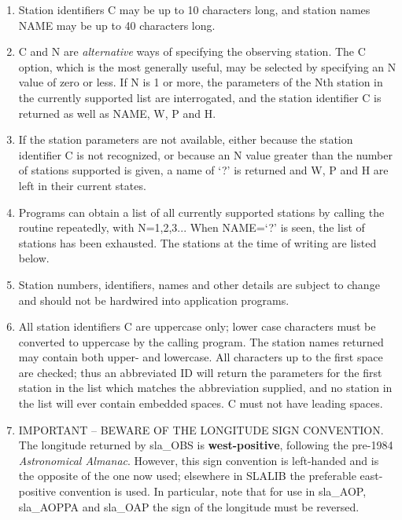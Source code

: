 \documentclass[11pt,twoside]{article}
\begin{document}
{
 \begin{enumerate}
  \item Station identifiers C may be up to 10 characters long,
        and station names NAME may be up to 40 characters long.
  \item C and N are {\it alternative}\/ ways of specifying the observing
        station.  The C option, which is the most generally useful,
        may be selected by specifying an N value of zero or less.
        If N is 1 or more, the parameters of the Nth station
        in the currently supported list are interrogated, and
        the station identifier C is returned as well as NAME, W,
        P and H.
  \item If the station parameters are not available, either because
        the station identifier C is not recognized, or because an
        N value greater than the number of stations supported is
        given, a name of `?' is returned and W, P and H are left in
        their current states.
  \item Programs can obtain a list of all currently supported
        stations by calling the routine repeatedly, with N=1,2,3...
        When NAME=`?' is seen, the list of stations has been
        exhausted.  The stations at the time of writing are listed
        below.
  \item Station numbers, identifiers, names and other details are
        subject to change and should not be hardwired into
        application programs.
  \item All station identifiers C are uppercase only;  lower case
        characters must be converted to uppercase by the calling
        program.  The station names returned may contain both upper-
        and lowercase.  All characters up to the first space are
        checked;  thus an abbreviated ID will return the parameters
        for the first station in the list which matches the
        abbreviation supplied, and no station in the list will ever
        contain embedded spaces.  C must not have leading spaces.
  \item IMPORTANT -- BEWARE OF THE LONGITUDE SIGN CONVENTION.  The
        longitude returned by sla\_OBS is
        {\bf west-positive}, following the pre-1984 {\it Astronomical
        Almanac}.  However, this sign convention is left-handed and is
        the opposite of the one now used; elsewhere in
        SLALIB the preferable east-positive convention is used.  In
        particular, note that for use in sla\_AOP, sla\_AOPPA and
        sla\_OAP the sign of the longitude must be reversed.

\end{enumerate}}
\end{document}
